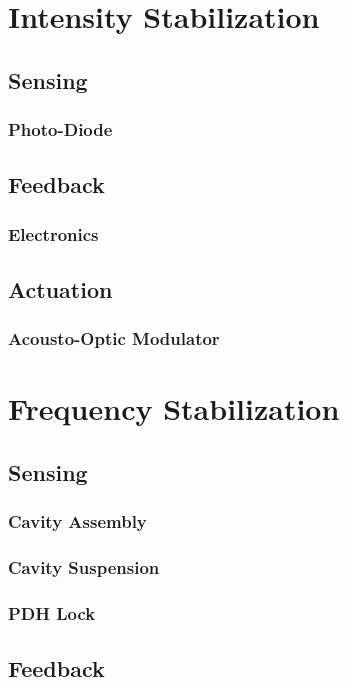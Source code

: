 \section{Intensity Stabilization}

\subsection{Sensing}
\subsubsection{Photo-Diode}

\subsection{Feedback}
\subsubsection{Electronics}

\subsection{Actuation}
\subsubsection{Acousto-Optic Modulator}


\section{Frequency Stabilization}

\subsection{Sensing}
\subsubsection{Cavity Assembly}
\subsubsection{Cavity Suspension}
\subsubsection{PDH Lock}

\subsection{Feedback}

